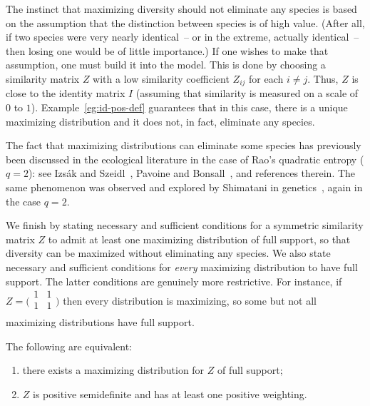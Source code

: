 The instinct that maximizing diversity should not eliminate any species is
based on the assumption that the distinction between species is of high
value.  (After all, if two species were very nearly identical~-- or in the
extreme, actually identical~-- then losing one would be of little
importance.)  If one wishes to make that assumption, one must build it into
the model.  This is done by choosing a similarity%
% 
% 
matrix $Z$ with a low similarity coefficient $Z_{ij}$ for each $i \neq j$.
Thus, $Z$ is close to the identity matrix $I$ (assuming that similarity is
measured on a scale of $0$ to $1$).  Example~\ref{eg:id-pos-def} guarantees
that in this case, there is a unique maximizing distribution and it does
not, in fact, eliminate any species.

The fact that maximizing distributions can eliminate some species has
previously been discussed in the ecological literature in the case of Rao's
quadratic entropy ($q = 2$): see Izs\'ak and Szeidl~\cite{IzSz},
Pavoine and Bonsall~\cite{PaBo}, and references therein.  The same
phenomenon was observed and explored by Shimatani in
genetics~\cite{ShimADD}, again in the case $q = 2$.

We finish by stating necessary and sufficient conditions for a symmetric
similarity matrix $Z$ to admit at least one maximizing distribution of full
support, so that diversity can be maximized without eliminating any
species.  We also state necessary and sufficient conditions for
\emph{every} maximizing distribution to have full support.  The latter
conditions are genuinely more restrictive.  For instance, if $Z =
\bigl( \begin{smallmatrix} 1& 1\\ 1& 1\\ \end{smallmatrix} \bigr)$ then
every distribution is maximizing, so some but not all maximizing
distributions have full support.

\begin{propn}
The following are equivalent:
% 
\begin{enumerate}
\item
{}
there exists a maximizing distribution for $Z$ of full support;

\item
{}
$Z$ is positive semidefinite and has at least one positive weighting.
\end{enumerate}
\end{propn}

